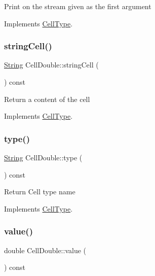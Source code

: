 Print on the stream given as the first argument 

Implements \hyperlink{class_cell_type_a34413fcb76f292b6b8d08615765ba894}{Cell\+Type}.

\mbox{\label{class_cell_double_a3e92f9ec4b564b3e14fa829529bbaf0a}} 
\subsubsection{\texorpdfstring{string\+Cell()}{stringCell()}}
{\footnotesize\ttfamily \hyperlink{class_string}{String} Cell\+Double\+::string\+Cell (\begin{DoxyParamCaption}{ }\end{DoxyParamCaption}) const\hspace{0.3cm}{\ttfamily [virtual]}}

Return a content of the cell 

Implements \hyperlink{class_cell_type_abba4d6d43efa340144d1ad09637e1aa9}{Cell\+Type}.

\mbox{\label{class_cell_double_a73662d15e8626c81858e3a243f0d6818}} 
\subsubsection{\texorpdfstring{type()}{type()}}
{\footnotesize\ttfamily \hyperlink{class_string}{String} Cell\+Double\+::type (\begin{DoxyParamCaption}{ }\end{DoxyParamCaption}) const\hspace{0.3cm}{\ttfamily [virtual]}}

Return Cell type name 

Implements \hyperlink{class_cell_type_ae31acfe1efc7776796d85918886247af}{Cell\+Type}.

\mbox{\label{class_cell_double_a6ed39c7b32c0599b4db0f046c7cfab93}} 
\subsubsection{\texorpdfstring{value()}{value()}}
{\footnotesize\ttfamily double Cell\+Double\+::value (\begin{DoxyParamCaption}{ }\end{DoxyParamCaption}) const\hspace{0.3cm}{\ttfamily [virtual]}}

